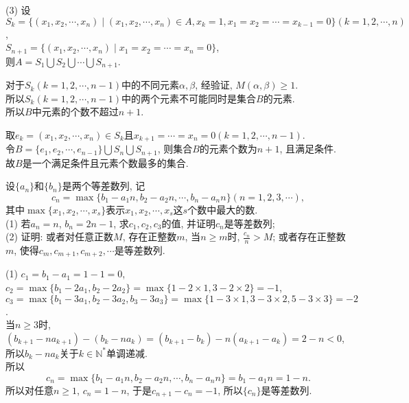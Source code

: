 \documentclass[green]{lsbook}
\begin{document}
(3) 设
$S_k=\{(x_1,x_2,\cdots,x_n)\mid (x_1,x_2,\cdots, x_n)\in A, x_k=1, x_1=x_2=\cdots =x_{k-1}=0\}(k=1,2,\cdots,n)$,\\ 
$S_{n+1}=\{ (x_1,x_2,\cdots, x_n)\mid x_1=x_2=\cdots =x_n=0\}$,\\ 
则$A=S_1\bigcup S_2\bigcup \cdots \bigcup S_{n+1}$. 

对于$S_k(k=1,2,\cdots, n-1)$中的不同元素$\alpha, \beta$, 经验证, $M(\alpha, \beta)\geq 1$. \\
所以$S_k(k=1,2,\cdots, n-1)$中的两个元素不可能同时是集合$B$的元素.\\ 
所以$B$中元素的个数不超过$n+1$. 

取$e_k=(x_1,x_2,\cdots, x_n)\in S_k$且$x_{k+1}=\cdots =x_n=0(k=1,2,\cdots, n-1)$. \\
令$B=\{e_1,e_2,\cdots, e_{n-1}\}\bigcup S_n\bigcup S_{n+1}$, 则集合$B$的元素个数为$n+1$, 且满足条件. \\
故$B$是一个满足条件且元素个数最多的集合. 





\newpage


\begin{tcolorbox}[applelight,title={2017.20(本小题13分)}]
设$\{a_n\}$和$\{b_n\}$是两个等差数列, 记
$$c_n=\max\{b_1-a_1 n, b_2-a_2 n,\cdots, b_n-a_n n\}(n=1,2,3,\cdots),$$
其中$\max\{x_1,x_2,\cdots, x_s\}$表示$x_1,x_2,\cdots, x_s$这$s$个数中最大的数.\\
 (1) 若$a_n=n$, $b_n=2n-1$, 求$c_1,c_2,c_3$的值, 并证明${c_n}$是等差数列;\\
 (2) 证明: 或者对任意正数$M$, 存在正整数$m$, 当$n\geq m$时, $\frac{c_n}{n}>M$; 或者存在正整数$m$, 使得$c_m, c_{m+1}, c_{m+2},\cdots$是等差数列.
\end{tcolorbox}


(1) $c_1=b_1-a_1=1-1=0$,\\
$c_2=\max\{b_1-2a_1,b_2-2a_2\}=\max \{1-2\times 1,3-2\times 2\}=-1$,\\ 
$c_3=\max \{b_1-3a_1,b_2-3a_2,b_3-3a_3\}=\max \{1-3\times 1,3-3\times 2,5-3\times 3\}=-2$.\\
当$n\geq 3$时, 
$(b_{k+1}-na_{k+1})-(b_k-na_k)=(b_{k+1}-b_k)-n(a_{k+1}-a_k)=2-n<0$, \\
所以$b_k-na_k$关于$k\in \mathbb{N}^{*}$单调递减.\\ 
所以\[c_n=\max \{b_1-a_1n,b_2-a_2 n,\cdots, b_n-a_nn\}=b_1-a_1n=1-n.\] 
所以对任意$n\geq 1$, $c_n=1-n$, 于是$c_{n+1}-c_n=-1$, 
所以$\{c_n\}$是等差数列. 
\end{document}
